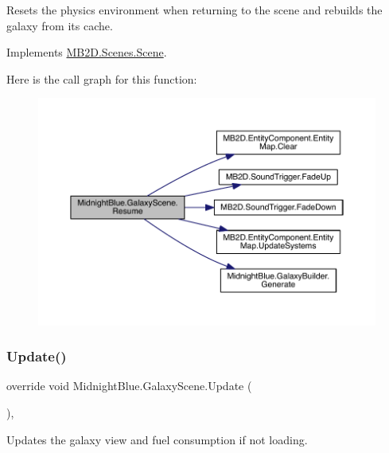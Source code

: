 Resets the physics environment when returning to the scene and rebuilds the galaxy from its cache. 



Implements \hyperlink{class_m_b2_d_1_1_scenes_1_1_scene_ad13639db22b059a1b714eefd9d927735}{M\+B2\+D.\+Scenes.\+Scene}.

Here is the call graph for this function\+:\nopagebreak
\begin{figure}[H]
\begin{center}
\leavevmode
\includegraphics[width=350pt]{class_midnight_blue_1_1_galaxy_scene_ab641e6727cdb64dc6487e9a229521692_cgraph}
\end{center}
\end{figure}
\hypertarget{class_midnight_blue_1_1_galaxy_scene_a9dfa66406143ed20f4d534c768f05a78}{}\label{class_midnight_blue_1_1_galaxy_scene_a9dfa66406143ed20f4d534c768f05a78} 
\subsubsection{\texorpdfstring{Update()}{Update()}}
{\footnotesize\ttfamily override void Midnight\+Blue.\+Galaxy\+Scene.\+Update (\begin{DoxyParamCaption}{ }\end{DoxyParamCaption})\hspace{0.3cm}{\ttfamily [inline]}, {\ttfamily [virtual]}}



Updates the galaxy view and fuel consumption if not loading. 




